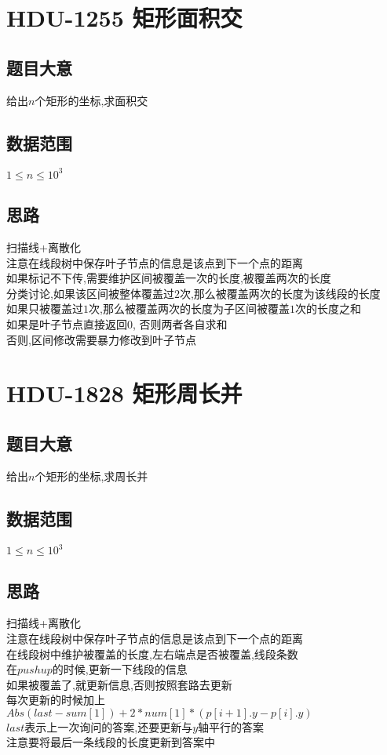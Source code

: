 \documentclass{ctexart}
\numberwithin{equation}{section}
\begin{document}
\begin{flushleft}
  \section{HDU-1255 矩形面积交}
  \subsection{题目大意}
  给出$n$个矩形的坐标,求面积交\\
  \subsection{数据范围}
  $1\le n\le 10^3$\\
  \subsection{思路}
  扫描线+离散化\\
  注意在线段树中保存叶子节点的信息是该点到下一个点的距离\\
  如果标记不下传,需要维护区间被覆盖一次的长度,被覆盖两次的长度\\
  分类讨论,如果该区间被整体覆盖过$2$次,那么被覆盖两次的长度为该线段的长度\\
  如果只被覆盖过$1$次,那么被覆盖两次的长度为子区间被覆盖$1$次的长度之和\\
  如果是叶子节点直接返回$0$, 否则两者各自求和\\
  否则,区间修改需要暴力修改到叶子节点\\
  \newpage

  \section{HDU-1828 矩形周长并}
  \subsection{题目大意}
  给出$n$个矩形的坐标,求周长并\\
  \subsection{数据范围}
  $1\le n\le 10^3$\\
  \subsection{思路}
  扫描线+离散化\\
  注意在线段树中保存叶子节点的信息是该点到下一个点的距离\\
  在线段树中维护被覆盖的长度,左右端点是否被覆盖,线段条数\\
  在$pushup$的时候,更新一下线段的信息\\
  如果被覆盖了,就更新信息,否则按照套路去更新\\
  每次更新的时候加上$Abs(last-sum[1])+2*num[1]*(p[i+1].y-p[i].y)$\\
  $last$表示上一次询问的答案,还要更新与$y$轴平行的答案\\
  注意要将最后一条线段的长度更新到答案中\\
  \newpage


\end{flushleft}
\end{document}
